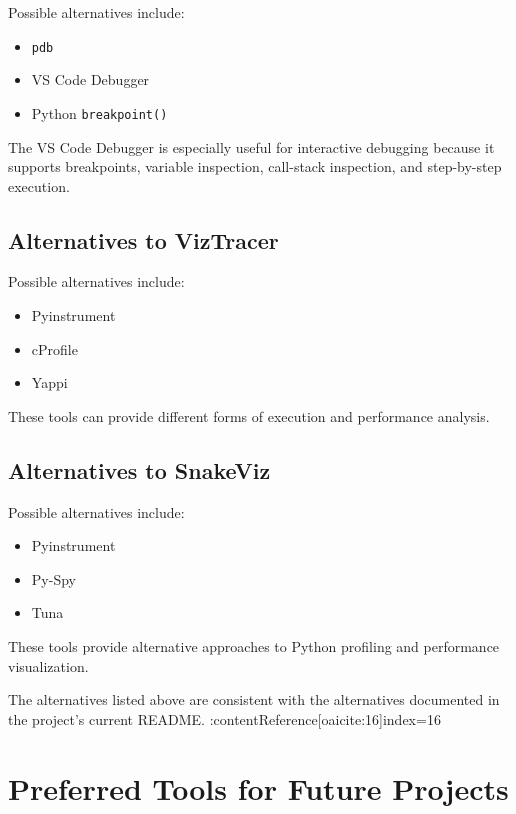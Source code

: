 \documentclass[12pt,a4paper]{report}
\begin{document}
Possible alternatives include:

\begin{itemize}
    \item \texttt{pdb}
    \item VS Code Debugger
    \item Python \texttt{breakpoint()}
\end{itemize}

The VS Code Debugger is especially useful for interactive debugging
because it supports breakpoints, variable inspection, call-stack
inspection, and step-by-step execution.

\section{Alternatives to VizTracer}

Possible alternatives include:

\begin{itemize}
    \item Pyinstrument
    \item cProfile
    \item Yappi
\end{itemize}

These tools can provide different forms of execution and performance
analysis.

\section{Alternatives to SnakeViz}

Possible alternatives include:

\begin{itemize}
    \item Pyinstrument
    \item Py-Spy
    \item Tuna
\end{itemize}

These tools provide alternative approaches to Python profiling and
performance visualization.

The alternatives listed above are consistent with the alternatives
documented in the project's current README. :contentReference[oaicite:16]{index=16}


\chapter{Preferred Tools for Future Projects}
\end{document}
